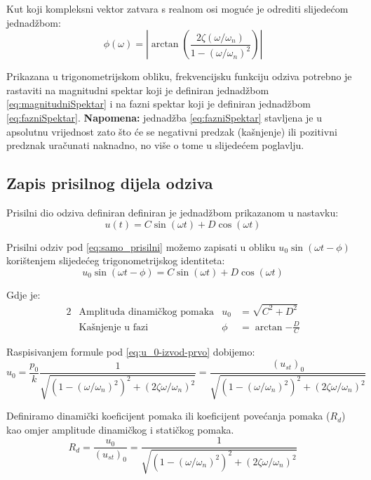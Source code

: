 Kut koji kompleksni vektor zatvara s realnom osi moguće je odrediti slijedećom
jednadžbom:
\begin{equation}
        \phi(\omega)=\left|\arctan\left(\frac{2\zeta(\omega/\omega_n)}
                      {1-(\omega/\omega_n)^2}\right)\right|\label{eq:fazniSpektar}
\end{equation}

Prikazana u trigonometrijskom obliku, frekvencijsku funkciju odziva potrebno je
rastaviti na magnitudni spektar koji je definiran jednadžbom \eqref{eq:magnitudniSpektar} i
na fazni spektar koji je definiran jednadžbom \eqref{eq:fazniSpektar}.
\textbf{Napomena:} jednadžba \eqref{eq:fazniSpektar} stavljena je u apsolutnu
vrijednost zato što će se negativni predzak (kašnjenje) ili pozitivni predznak
uračunati naknadno, no više o tome u slijedećem poglavlju.

\subsection{Zapis prisilnog dijela odziva}
Prisilni dio odziva definiran definiran je jednadžbom prikazanom u nastavku:
\begin{equation}\label{eq:samo_prisilni}
    u(t)=C\sin(\omega t) + D\cos(\omega t)
\end{equation}

Prisilni odziv pod \eqref{eq:samo_prisilni} možemo zapisati u obliku $u_0\sin(\omega t
- \phi)$ 
korištenjem slijedećeg trigonometrijskog identiteta:
\begin{equation}\label{eq:prisilni_dio_odziva}
    u_0\sin(\omega t - \phi) = C\sin(\omega t) + D\cos(\omega t)
\end{equation}

Gdje je:
\begin{alignat}{2}
    &\text{Amplituda dinamičkog pomaka} & u_0 &= \sqrt{C^2+D^2}\label{eq:u_0-izvod-prvo}\\
    &\text{Kašnjenje u fazi} & \phi &= \arctan{-\frac{D}{C}}\label{eq:fi-izvod}
\end{alignat}

Raspisivanjem formule pod \eqref{eq:u_0-izvod-prvo} dobijemo:
\begin{equation}\label{eq:u_0-izvod-raspisano}
    u_0 = \frac{p_0}{k}\frac{1}{\sqrt{(1-(\omega/\omega_n)^2)^2+(2\zeta\omega/\omega_n)^2}}
        = \frac{(u_{st})_0}{\sqrt{(1-(\omega/\omega_n)^2)^2+(2\zeta\omega/\omega_n)^2}}
\end{equation}

Definiramo dinamički koeficijent pomaka ili koeficijent povećanja pomaka ($R_d$) kao omjer
amplitude dinamičkog i statičkog pomaka.
\begin{equation}\label{eq:R_d-izvod-konacno}
    R_d = \frac{u_0}{(u_{st})_0}=\frac{1}{\sqrt{(1-(\omega/\omega_n)^2)^2+(2\zeta\omega/\omega_n)^2}}
\end{equation}

